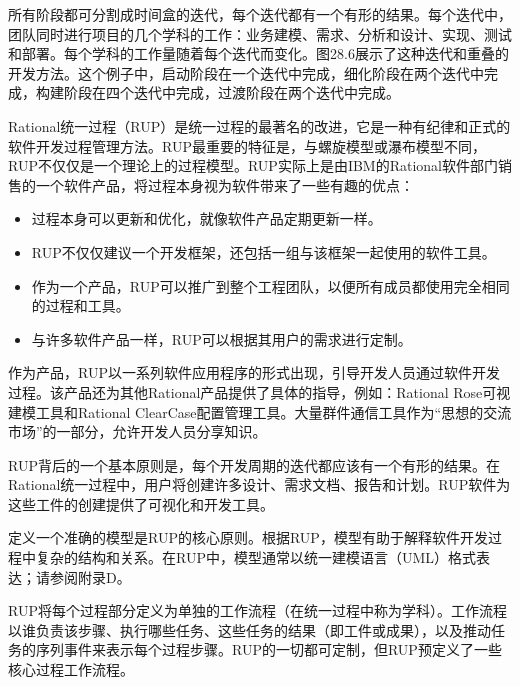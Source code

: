 所有阶段都可分割成时间盒的迭代，每个迭代都有一个有形的结果。每个迭代中，团队同时进行项目的几个学科的工作：业务建模、需求、分析和设计、实现、测试和部署。每个学科的工作量随着每个迭代而变化。图28.6展示了这种迭代和重叠的开发方法。这个例子中，启动阶段在一个迭代中完成，细化阶段在两个迭代中完成，构建阶段在四个迭代中完成，过渡阶段在两个迭代中完成。



Rational统一过程（RUP）是统一过程的最著名的改进，它是一种有纪律和正式的软件开发过程管理方法。RUP最重要的特征是，与螺旋模型或瀑布模型不同，RUP不仅仅是一个理论上的过程模型。RUP实际上是由IBM的Rational软件部门销售的一个软件产品，将过程本身视为软件带来了一些有趣的优点：

\begin{itemize}
\item
过程本身可以更新和优化，就像软件产品定期更新一样。

\item
RUP不仅仅建议一个开发框架，还包括一组与该框架一起使用的软件工具。

\item
作为一个产品，RUP可以推广到整个工程团队，以便所有成员都使用完全相同的过程和工具。

\item
与许多软件产品一样，RUP可以根据其用户的需求进行定制。
\end{itemize}


作为产品，RUP以一系列软件应用程序的形式出现，引导开发人员通过软件开发过程。该产品还为其他Rational产品提供了具体的指导，例如：Rational Rose可视建模工具和Rational ClearCase配置管理工具。大量群件通信工具作为“思想的交流市场”的一部分，允许开发人员分享知识。

RUP背后的一个基本原则是，每个开发周期的迭代都应该有一个有形的结果。在Rational统一过程中，用户将创建许多设计、需求文档、报告和计划。RUP软件为这些工件的创建提供了可视化和开发工具。


定义一个准确的模型是RUP的核心原则。根据RUP，模型有助于解释软件开发过程中复杂的结构和关系。在RUP中，模型通常以统一建模语言（UML）格式表达；请参阅附录D。

RUP将每个过程部分定义为单独的工作流程（在统一过程中称为学科）。工作流程以谁负责该步骤、执行哪些任务、这些任务的结果（即工件或成果），以及推动任务的序列事件来表示每个过程步骤。RUP的一切都可定制，但RUP预定义了一些核心过程工作流程。

